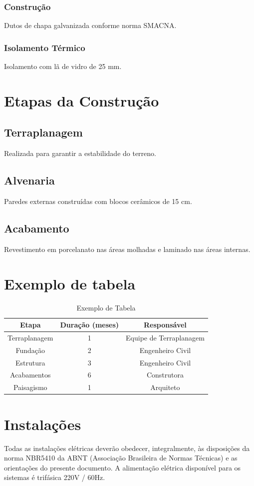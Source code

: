 \subsubsection{Construção}
Dutos de chapa galvanizada conforme norma SMACNA.

\subsubsection{Isolamento Térmico}
Isolamento com lã de vidro de 25 mm.

\section{Etapas da Construção}
\subsection{Terraplanagem}
Realizada para garantir a estabilidade do terreno.

\subsection{Alvenaria}
Paredes externas construídas com blocos cerâmicos de 15 cm.

\subsection{Acabamento}
Revestimento em porcelanato nas áreas molhadas e laminado nas áreas internas.

\section{Exemplo de tabela}
\begin{table}[h!]
\centering
\begin{tabular}{ccc}
\toprule
\textbf{Etapa} & \textbf{Duração (meses)} & \textbf{Responsável} \\ \midrule
Terraplanagem & 1 & Equipe de Terraplanagem \\ 
Fundação & 2 & Engenheiro Civil \\ 
Estrutura & 3 & Engenheiro Civil \\ 
Acabamentos & 6 & Construtora \\ 
Paisagismo & 1 & Arquiteto \\ \bottomrule
\end{tabular}
\caption{Exemplo de Tabela}
\label{tab:cronograma}
\end{table}

\section{Instalações}

Todas as instalações elétricas deverão obedecer, integralmente, às disposições da norma NBR5410 da ABNT (Associação Brasileira de Normas Técnicas) e as orientações do presente documento. A alimentação elétrica disponível para os sistemas é trifásica 220V / 60Hz.